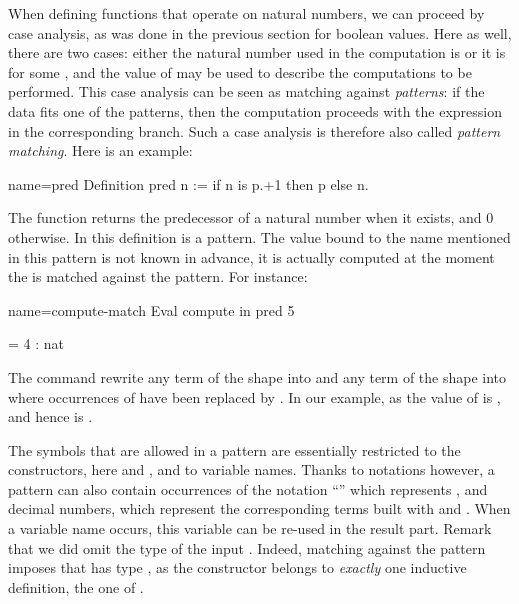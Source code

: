 When defining functions that operate on natural numbers, we can
proceed by case analysis, as was done in the previous section for boolean
values. Here as well, there are two cases: either the natural number used in
the computation is  or it is  for
some , and the value of  may be used to describe the
computations to be performed. This case analysis can be seen as
matching against \emph{patterns}: if the data fits one of
the patterns, then the computation proceeds with the expression in the
corresponding branch.  Such a case analysis is therefore also called
\emph{pattern matching}. Here is an example:

\begin{coq}{name=pred}{}
Definition pred n := if n is p.+1 then p else n.
\end{coq}

The function  returns the predecessor of a natural number
when it exists, and 0 otherwise. In this definition  is a
pattern. The value bound to the name  mentioned in this pattern is not
known in advance, it is actually computed at the moment the  is matched
against the pattern. For instance:

\begin{coq}{name=compute-match}{}
Eval compute in pred 5
\end{coq}
\begin{coqout}{}{}
= 4 : nat
\end{coqout}

The  command rewrite any term of the shape
 into  and any term of the shape
 into  where occurrences of
 have been replaced by . In our example, as the value of
 is ,  and hence  is .


The symbols that are allowed in a pattern are essentially restricted
to the constructors, here  and , and to variable names.
Thanks to notations however, a pattern can also contain
occurrences of the notation ``'' which represents , and
decimal numbers, which represent the corresponding terms built with
 and .  When a variable name occurs, this variable can be
re-used in the result part.
Remark that we did omit the type of the input . Indeed, matching
 against  the  pattern imposes that  has type
, as the  constructor belongs to \emph{exactly}
one inductive definition, the one of .

